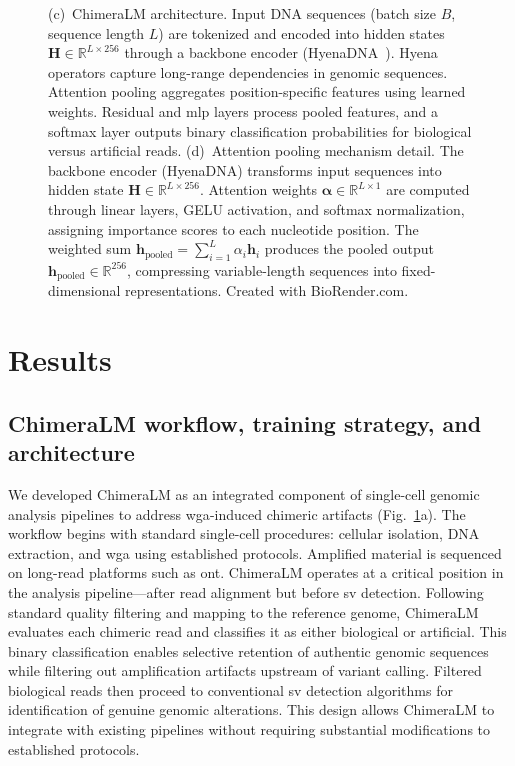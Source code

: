 \documentclass[pdflatex,sn-nature,lineno]{sn-jnl}%
\theoremstyle{thmstyleone}%
\theoremstyle{thmstyletwo}%
\theoremstyle{thmstylethree}%
\begin{document}
\begin{figure}[p]
{		(c)~ChimeraLM architecture. Input DNA sequences (batch size $B$, sequence length $L$) are tokenized and encoded into hidden states $\mathbf{H} \in \mathbb{R}^{L \times 256}$ through a backbone encoder (HyenaDNA~\cite{nguyen2023hyenadna}). Hyena operators capture long-range dependencies in genomic sequences. Attention pooling aggregates position-specific features using learned weights. Residual and \gls{mlp} layers process pooled features, and a softmax layer outputs binary classification probabilities for biological versus artificial reads.
		(d)~Attention pooling mechanism detail. The backbone encoder (HyenaDNA) transforms input sequences into hidden state $\mathbf{H} \in \mathbb{R}^{L \times 256}$. Attention weights $\boldsymbol{\alpha} \in \mathbb{R}^{L \times 1}$ are computed through linear layers, GELU activation, and softmax normalization, assigning importance scores to each nucleotide position. The weighted sum $\mathbf{h}_{\text{pooled}} = \sum_{i=1}^{L} \alpha_i \mathbf{h}_i$ produces the pooled output $\mathbf{h}_{\text{pooled}} \in \mathbb{R}^{256}$, compressing variable-length sequences into fixed-dimensional representations.
		Created with BioRender.com.} 
	\label{fig:figure1}
\end{figure}

\section*{Results}\label{sec:results}

\subsection*{ChimeraLM workflow, training strategy, and architecture}

We developed ChimeraLM as an integrated component of single-cell genomic analysis pipelines to address \gls{wga}-induced chimeric artifacts (Fig.~\ref{fig:figure1}a).
The workflow begins with standard single-cell procedures: cellular isolation, DNA extraction, and \gls{wga} using established protocols.
Amplified material is sequenced on long-read platforms such as \gls{ont}.
ChimeraLM operates at a critical position in the analysis pipeline—after read alignment but before \gls{sv} detection.
Following standard quality filtering and mapping to the reference genome, ChimeraLM evaluates each chimeric read and classifies it as either biological or artificial.
This binary classification enables selective retention of authentic genomic sequences while filtering out amplification artifacts upstream of variant calling.
Filtered biological reads then proceed to conventional \gls{sv} detection algorithms for identification of genuine genomic alterations.
This design allows ChimeraLM to integrate with existing pipelines without requiring substantial modifications to established protocols.
\end{document}
